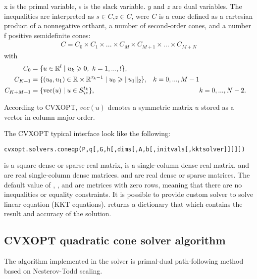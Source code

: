 x is the primal variable, s is the slack variable. $y$ and $z$ are dual variables. The inequalities are interpreted as $s\in C$,$z\in C$, were $C$ is a cone defined as a cartesian product of a nonnegative orthant, a number of second-order cones, and a number f positive semidefinite cones:
\begin{equation*}
	\begin{aligned}
		C = C_0 \times C_1 \times ... \times C_M \times C_{M+1}\times ... \times C_{M+N}
	\end{aligned}
\end{equation*}
with
\begin{equation*}
	\begin{aligned}
		C_0 &= \lbrace u\in \mathbb{R}^l \mid u_k \geqslant 0, \text{ }k=1,...,l \rbrace,\\
		C_{K+1} &= \lbrace (u_0,u_1) \in \mathbb{R}\times \mathbb{R}^{\tau_k-1} \mid u_0 \geqslant \| u_1\|_2 \rbrace , & k=0,...,M-1\\
		C_{K+M+1} &=\lbrace \text{vec}(u) \mid u\in S_{\+}^{t_k}\rbrace, & & k=0,...,N-2.
	\end{aligned}
\end{equation*}

According to CVXOPT, $vec(u)$ denotes a symmetric matrix $u$ stored as a vector in column major order.

The CVXOPT typical  interface look like the following:

\begin{lstlisting}
cvxopt.solvers.coneqp(P,q[,G,h[,dims[,A,b[,initvals[,kktsolver]]]]])	
\end{lstlisting}

 is a square dense or sparse real matrix,  is a single-column dense real matrix.  and  are real single-column dense matrices.  and  are real dense or sparse matrices. The default value of , , and  are metrices with zero rows, meaning that there are no inequalities or equality constraints. It is possible to provide custom solver to solve linear equation (KKT equations).  returns a dictionary that which contains the result and accuracy of the solution.

\subsection*{CVXOPT quadratic cone solver algorithm}

The algorithm implemented in the  solver is primal-dual path-following method based on Nesterov-Todd scaling. 
































